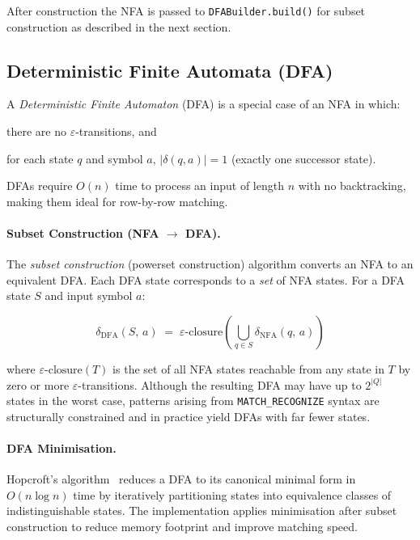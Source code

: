 After construction the NFA is passed to \texttt{DFABuilder.build()}
for subset construction as described in the next section.

\subsection{Deterministic Finite Automata (DFA)}
\label{subsec:meth-dfa}

A \emph{Deterministic Finite Automaton} (DFA) is a special case of
an NFA in which:
\begin{enumerate*}[label=(\roman*)]
  \item there are no $\varepsilon$-transitions, and
  \item for each state $q$ and symbol $a$, $|\delta(q,a)| = 1$
    (exactly one successor state).
\end{enumerate*}
DFAs require $O(n)$ time to process an input of length $n$ with no
backtracking, making them ideal for row-by-row matching.

\paragraph{Subset Construction (NFA $\to$ DFA).}
The \emph{subset construction} (powerset construction) algorithm
converts an NFA to an equivalent DFA.  Each DFA state corresponds
to a \emph{set} of NFA states.  For a DFA state $S$ and input
symbol $a$:

\[
  \delta_{\text{DFA}}(S,\,a)
  \;=\;
  \varepsilon\text{-closure}\!\left(
    \bigcup_{q \in S} \delta_{\text{NFA}}(q,\,a)
  \right)
\]

where $\varepsilon\text{-closure}(T)$ is the set of all NFA states
reachable from any state in $T$ by zero or more
$\varepsilon$-transitions.  Although the resulting DFA may have up
to $2^{|Q|}$ states in the worst case, patterns arising from
\texttt{MATCH\_RECOGNIZE} syntax are structurally constrained and in
practice yield DFAs with far fewer states.

\paragraph{DFA Minimisation.}
Hopcroft's algorithm~\cite{HopcroftUllman} reduces a DFA to its
canonical minimal form in $O(n \log n)$ time by iteratively
partitioning states into equivalence classes of
indistinguishable states.  The implementation applies minimisation
after subset construction to reduce memory footprint and improve
matching speed.

